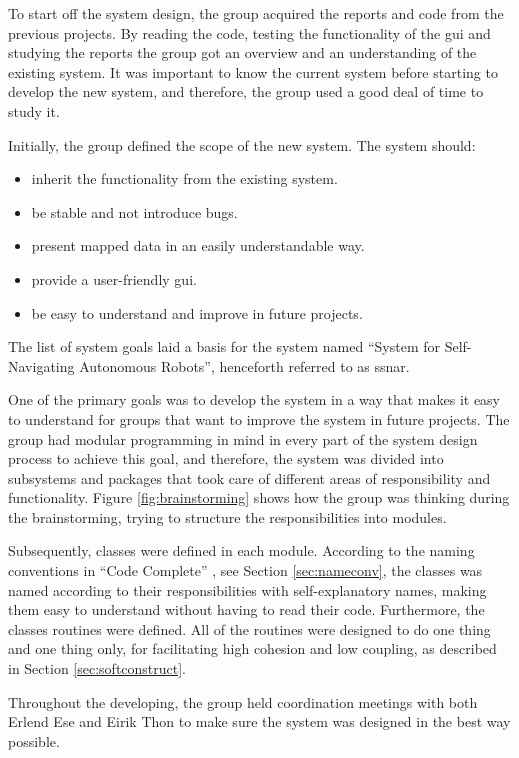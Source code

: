 To start off the system design, the group acquired the reports and code from the previous projects. By reading the code, testing the functionality of the \acrshort{gui} and studying the reports the group got an overview and an understanding of the existing system. It was important to know the current system before starting to develop the new system, and therefore, the group used a good deal of time to study it.

Initially, the group defined the scope of the new system. The system should:
\begin{itemize}
    \item inherit the functionality from the existing system.
    \item be stable and not introduce bugs.
    \item present mapped data in an easily understandable way.
    \item provide a user-friendly \acrshort{gui}.
    \item be easy to understand and improve in future projects.
\end{itemize}
The list of system goals laid a basis for the system named ``System for Self-Navigating Autonomous Robots'', henceforth referred to as \acrshort{ssnar}.

One of the primary goals was to develop the system in a way that makes it easy to understand for groups that want to improve the system in future projects. The group had modular programming in mind in every part of the system design process to achieve this goal, and therefore, the system was divided into subsystems and packages that took care of different areas of responsibility and functionality. Figure \ref{fig:brainstorming} shows how the group was thinking during the brainstorming, trying to structure the responsibilities into modules. 

Subsequently, classes were defined in each module. According to the naming conventions in ``Code Complete'' \cite{stevemcconnell2004}, see Section \ref{sec:nameconv}, the classes was named according to their responsibilities with self-explanatory names, making them easy to understand without having to read their code. Furthermore, the classes routines were defined. All of the routines were designed to do one thing and one thing only, for facilitating high cohesion and low coupling, as described in Section \ref{sec:softconstruct}.

Throughout the developing, the group held coordination meetings with both Erlend Ese and Eirik Thon to make sure the system was designed in the best way possible.
